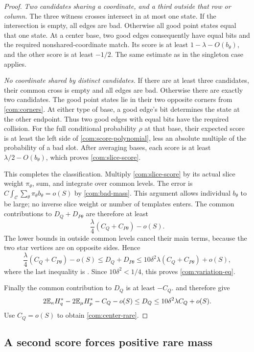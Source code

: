 \begin{proof}
\emph{Two candidates sharing a coordinate, and a third outside that row
or column.}
The three witness crosses intersect in at most one state. If the
intersection is empty, all edges are bad. Otherwise all good point states
equal that one state. At a center base, two good edges consequently have
equal bits and the required nonshared-coordinate match. Its score is at
least \(1-\lambda-O(b_\theta)\), and the other score is at least \(-1/2\).
The same estimate as in the singleton case applies.

\emph{No coordinate shared by distinct candidates.}
If there are at least three candidates, their common cross is empty and
all edges are bad. Otherwise there are exactly two candidates. The good
point states lie in their two opposite corners from \eqref{com:corners}.
At either type of base, a good edge's bit determines the state at the other
endpoint. Thus two good edges with equal bits have the required collision.
For the full conditional probability \(\rho\) at that base, their expected
score is at least the left side of \eqref{com:score-polynomial}, less an
absolute multiple of the probability of a bad slot. After averaging bases,
each score is at least \(\lambda/2-O(b_\theta)\), which proves
\eqref{com:slice-score}.

This completes the classification. Multiply \eqref{com:slice-score} by its
actual slice weight \(\pi_\theta\), sum, and integrate over common levels.
The error is
\(C\int_{\mathcal C}\sum_\theta\pi_\theta b_\theta=o(S)\) by
\eqref{com:bad-mass}. This argument allows individual \(b_\theta\) to be
large; no inverse slice weight or number of templates enters. The common
contributions to \(D_Q+D_{P\theta}\) are therefore at least
\[
 \frac\lambda4(C_Q+C_{P\theta})-o(S).
\]
The lower bounds in  outside common levels cancel their
main terms, because the two star vertices are on opposite sides. Hence
\[
 \frac\lambda4(C_Q+C_{P\theta})-o(S)
 \le D_Q+D_{P\theta}
 \le 10\delta^2\lambda(C_Q+C_{P\theta})+o(S),
\]
where the last inequality is . Since
\(10\delta^2<1/4\), this proves \eqref{com:variation-eq}.

Finally the common contribution to \(D_Q\) is at least \(-C_Q\).
 and  therefore give
\[
 2\mathbb E_\kappa H_q^*-2\mathbb E_\mu H_p^*-C_Q-o(S)
 \le D_Q\le10\delta^2\lambda C_Q+o(S).
\]
Use \(C_Q=o(S)\) to obtain \eqref{com:center-rare}.
\end{proof}

\subsection{A second score forces positive rare mass}

